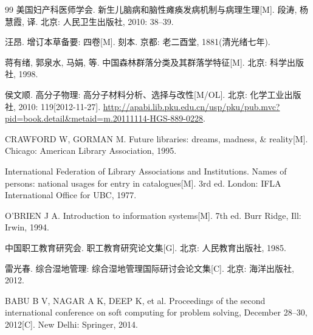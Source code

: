 
\begin{thebibliography}{99}
\setlength{\itemsep}{0pt} %
\setlength{\parskip}{0pt} %
 美国妇产科医师学会. 新生儿脑病和脑性瘫痪发病机制与病理生理[M]. 段涛, 杨慧霞, 译. 北京: 人民卫生出版社, 2010: 38–39.

 汪昂. 增订本草备要: 四卷[M]. 刻本. 京都: 老二酉堂, 1881(清光绪七年).

 蒋有绪, 郭泉水, 马娟, 等. 中国森林群落分类及其群落学特征[M]. 北京: 科学出版社, 1998.

 侯文顺. 高分子物理: 高分子材料分析、选择与改性[M/OL]. 北京: 化学工业出版社, 2010: 119[2012-11-27]. 
\url{http://apabi.lib.pku.edu.cn/usp/pku/pub.mvc?pid=book.detail\&metaid=m.20111114-HGS-889-0228}.

 CRAWFORD W, GORMAN M. Future libraries: dreams, madness, \& reality[M]. Chicago: American Library Association, 1995.

 International Federation of Library Associations and Institutions. Names of persons: national usages for entry in catalogues[M]. 3rd ed. London: IFLA International Office for UBC, 1977.

 O’BRIEN J A. Introduction to information systems[M]. 7th ed. Burr Ridge, Ill: Irwin, 1994.

 中国职工教育研究会. 职工教育研究论文集[G]. 北京: 人民教育出版社, 1985.

 雷光春. 综合湿地管理: 综合湿地管理国际研讨会论文集[C]. 北京: 海洋出版社, 2012.

 BABU B V, NAGAR A K, DEEP K, et al. Proceedings of the second international conference on soft computing for problem solving, December 28–30, 2012[C]. New Delhi: Springer, 2014.


\end{thebibliography}
